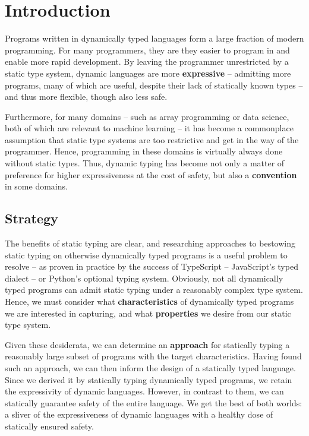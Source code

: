 \chapter{Introduction}
\label{introduction}

Programs written in dynamically typed languages form a large fraction of modern programming. 
For many programmers, they are they easier to program in and enable more rapid development.
By leaving the programmer unrestricted by a static type system, dynamic languages are more \textbf{expressive} -- admitting more programs, many of which are useful, despite their lack of statically known types -- and thus more flexible, though also less safe.

Furthermore, for many domains -- such as array programming or data science, both of which are relevant to machine learning -- it has become a commonplace assumption that static type systems are too restrictive and get in the way of the programmer. Hence, programming in these domains is virtually always done without static types.
Thus, dynamic typing has become not only a matter of preference for higher expressiveness at the cost of safety, but also a \textbf{convention} in some domains.

\section{Strategy}

The benefits of static typing are clear, and researching approaches to bestowing static typing on otherwise dynamically typed programs is a useful problem to resolve -- as proven in practice by the success of TypeScript -- JavaScript's typed dialect -- or Python's optional typing system. 
Obviously, not all dynamically typed programs can admit static typing under a reasonably complex type system. 
Hence, we must consider what \textbf{characteristics} of dynamically typed programs we are interested in capturing, and what \textbf{properties} we desire from our static type system. 

Given these desiderata, we can determine an \textbf{approach} for statically typing a reasonably large subset of programs with the target characteristics.
Having found such an approach, we can then inform the design of a statically typed language. 
Since we derived it by statically typing dynamically typed programs, we retain the expressivity of dynamic languages. However, in contrast to them, we can statically guarantee safety of the entire language.
We get the best of both worlds: a sliver of the expressiveness of dynamic languages with a healthy dose of statically ensured safety.


